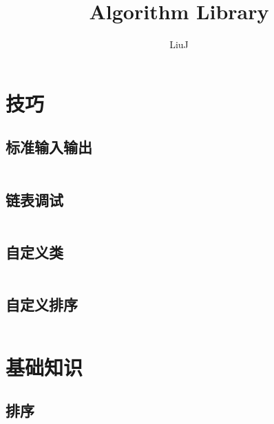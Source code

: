 \documentclass[a4paper,11pt]{article}
\author{LiuJ}
\title{Algorithm Library}
\begin{document}
 
\maketitle %
\newpage %
\tableofcontents %


\newpage
\section{技巧}

\subsection{标准输入输出}
\inputminted[linenos,autogobble]{java}{util/in-out.java}

\subsection{链表调试}
\inputminted[linenos,autogobble]{java}{util/linkedlist-debug.java}

\subsection{自定义类}
\inputminted[linenos,autogobble]{java}{util/bind.java}

\subsection{自定义排序}
\inputminted[linenos,autogobble]{java}{util/sort-api.java}


\newpage
\section{基础知识}

\subsection{排序}
\end{document}
